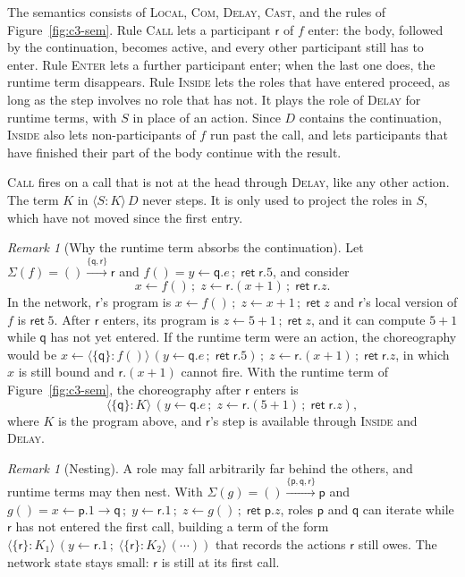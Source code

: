 \documentclass[11pt]{report}
\theoremstyle{plain}
\theoremstyle{definition}
\theoremstyle{remark}
\newtheorem{remark}[theorem]{Remark}
\newcommand{\kw}[1]{\mathsf{#1}}
\newcommand{\pp}{\mathsf{p}}
\newcommand{\qq}{\mathsf{q}}
\newcommand{\rr}{\mathsf{r}}
\newcommand{\bind}[3]{#1 \leftarrow #2\,;\;#3}
\newcommand{\cret}[1]{\kw{ret}\;#1}
\newcommand{\com}[3]{#1.#2 \to #3}
\newcommand{\rt}[3]{\langle #1 : #2\rangle\,#3}
\newcommand{\Sig}{\Sigma}
\newcommand{\farr}[3]{(#1) \xrightarrow{#2} #3}
\newcommand{\rn}[1]{{\normalfont\scshape #1}}
\begin{document}
The semantics consists of \rn{Local}, \rn{Com}, \rn{Delay}, \rn{Cast}, and
the rules of Figure~\ref{fig:c3-sem}.  Rule \rn{Call} lets a participant
$\rr$ of $f$ enter: the body, followed by the continuation, becomes active,
and every other participant still has to enter.  Rule \rn{Enter} lets a
further participant enter; when the last one does, the runtime term
disappears.  Rule \rn{Inside} lets the roles that have entered proceed, as
long as the step involves no role that has not.  It plays the role of
\rn{Delay} for runtime terms, with $S$ in place of an action.  Since $D$
contains the continuation, \rn{Inside} also lets non-participants of $f$ run
past the call, and lets participants that have finished their part of the
body continue with the result.

\rn{Call} fires on a call that is not at the head through \rn{Delay}, like any
other action.  The term $K$ in $\rt{S}{K}{D}$ never steps.  It is only used
to project the roles in $S$, which have not moved since the first entry.

\begin{remark}[Why the runtime term absorbs the continuation]\label{rem:c3-action}
  Let $\Sig(f)=\farr{}{\{\qq,\rr\}}{\rr}$ and
  $f()=\bind{y}{\qq.e}{\cret{\rr.5}}$, and consider
  \[
    \bind{x}{f()}{\bind{z}{\rr.(x+1)}{\cret{\rr.z}}}.
  \]
  In the network, $\rr$'s program is
  $x\leftarrow f()\,;\;z\leftarrow x+1\,;\;\kw{ret}\;z$ and $\rr$'s local
  version of $f$ is $\kw{ret}\;5$.  After $\rr$ enters, its program is
  $z\leftarrow 5+1\,;\;\kw{ret}\;z$, and it can compute $5+1$ while $\qq$ has
  not yet entered.  If the runtime term were an action, the choreography would
  be $\bind{x}{\rt{\{\qq\}}{f()}{(\bind{y}{\qq.e}{\cret{\rr.5}})}}{\bind{z}{\rr.(x+1)}{\cret{\rr.z}}}$,
  in which $x$ is still bound and $\rr.(x+1)$ cannot fire.  With the runtime
  term of Figure~\ref{fig:c3-sem}, the choreography after $\rr$ enters is
  \[
    \rt{\{\qq\}}{K}{(\bind{y}{\qq.e}{\bind{z}{\rr.(5+1)}{\cret{\rr.z}}})},
  \]
  where $K$ is the program above,
  and $\rr$'s step is available through \rn{Inside} and \rn{Delay}.
\end{remark}

\begin{remark}[Nesting]\label{rem:c3-nesting}
  A role may fall arbitrarily far behind the others, and runtime terms may
  then nest.  With $\Sig(g)=\farr{}{\{\pp,\qq,\rr\}}{\pp}$ and
  $g()=\bind{x}{\com{\pp}{1}{\qq}}{\bind{y}{\rr.1}{\bind{z}{g()}{\cret{\pp.z}}}}$,
  roles $\pp$ and $\qq$ can iterate while $\rr$ has not entered the first
  call, building a term of the form
  $\rt{\{\rr\}}{K_1}{(\bind{y}{\rr.1}{\rt{\{\rr\}}{K_2}{(\cdots)}})}$ that
  records the actions $\rr$ still owes.  The network state stays small:
  $\rr$ is still at its first call.
\end{remark}
\end{document}
